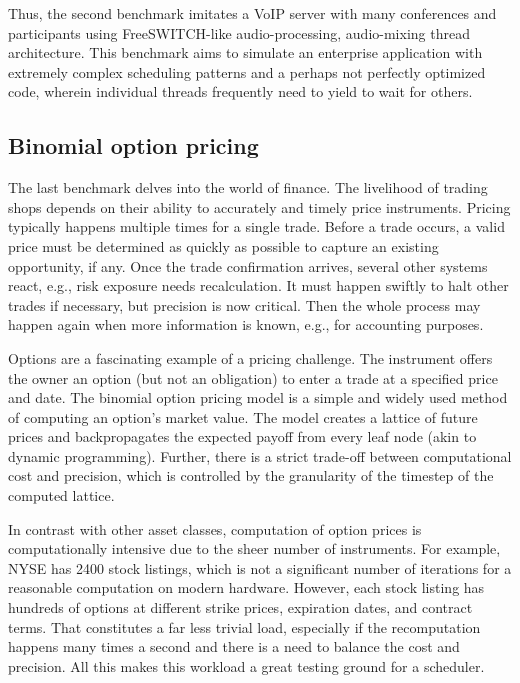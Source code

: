 \documentclass[12pt,a4paper,twoside]{report}
\begin{document}
Thus, the second benchmark imitates a VoIP server with many conferences and participants using FreeSWITCH-like \cite{Maruzzelli2017-ou} audio-processing, audio-mixing thread architecture. This benchmark aims to simulate an enterprise application with extremely complex scheduling patterns and a perhaps not perfectly optimized code, wherein individual threads frequently need to yield to wait for others.

\subsection{Binomial option pricing}
\label{section:bench-option-pricing}

The last benchmark delves into the world of finance. The livelihood of trading shops depends on their ability to accurately and timely price instruments. Pricing typically happens multiple times for a single trade. Before a trade occurs, a valid price must be determined as quickly as possible to capture an existing opportunity, if any. Once the trade confirmation arrives, several other systems react, e.g., risk exposure needs recalculation. It must happen swiftly to halt other trades if necessary, but precision is now critical. Then the whole process may happen again when more information is known, e.g., for accounting purposes. 

Options are a fascinating example of a pricing challenge. The instrument offers the owner an option (but not an obligation) to enter a trade at a specified price and date. The binomial option pricing model is a simple and widely used method of computing an option's market value. The model creates a lattice of future prices and backpropagates the expected payoff from every leaf node (akin to dynamic programming). Further, there is a strict trade-off between computational cost and precision, which is controlled by the granularity of the timestep of the computed lattice.

In contrast with other asset classes, computation of option prices is computationally intensive due to the sheer number of instruments. For example, NYSE has 2400 stock listings, which is not a significant number of iterations for a reasonable computation on modern hardware. However, each stock listing has hundreds of options at different strike prices, expiration dates, and contract terms. That constitutes a far less trivial load, especially if the recomputation happens many times a second and there is a need to balance the cost and precision. All this makes this workload a great testing ground for a scheduler.
\end{document}
